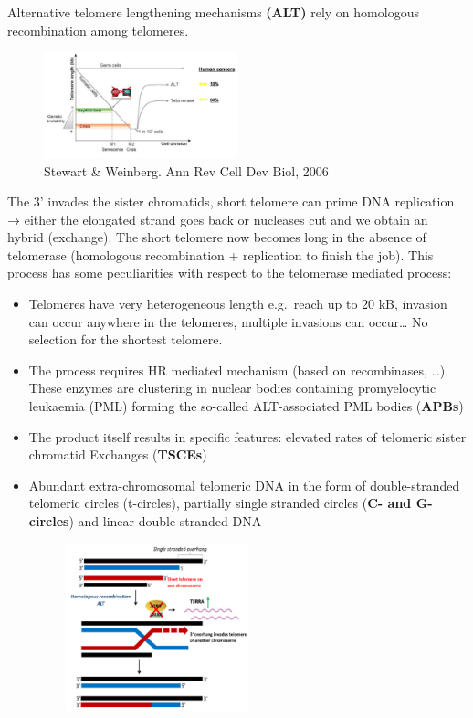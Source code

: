 Alternative telomere lengthening mechanisms \textbf{(ALT) }rely on
homologous recombination among telomeres.

\begin{figure}
\centering
\includegraphics[width=0.5\textwidth]{../_resources/Screen_Shot_2022-12-17_at_18-04-37.png}
\caption{Stewart \& Weinberg. Ann Rev Cell Dev Biol, 2006}
\end{figure}

The 3' invades the sister chromatids, short telomere can prime DNA
replication → either the elongated strand goes back or nucleases cut and
we obtain an hybrid (exchange). The short telomere now
becomes long in the absence of telomerase (homologous recombination +
replication to finish the job). This process has some peculiarities with
respect to the telomerase mediated process:

\begin{itemize}
\item
  Telomeres have very heterogeneous length e.g.~reach up to 20 kB,
  invasion can occur anywhere in the telomeres, multiple invasions can
  occur\ldots{} No selection for the shortest telomere.
\item
  The process requires HR mediated mechanism (based on recombinases,
  \ldots). These enzymes are clustering in nuclear bodies containing
  promyelocytic leukaemia (PML) forming the so-called ALT-associated PML
  bodies (\textbf{APBs})
\item
  The product itself results in specific features: elevated rates of
  telomeric sister chromatid Exchanges (\textbf{TSCEs})
\item
  Abundant extra-chromosomal telomeric DNA in the form of
  double-stranded telomeric circles (t-circles), partially single
  stranded circles (\textbf{C- and G-circles}) and linear
  double-stranded DNA

  \begin{figure}
  \centering
  \includegraphics[width=0.5\textwidth]{../_resources/Screen_Shot_2022-12-16_at_21-36-20.png}
  \caption{}
  \end{figure}
\end{itemize}


